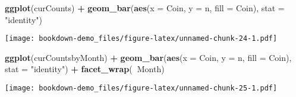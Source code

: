 \documentclass[
]{book}
\newenvironment{Shaded}{\begin{snugshade}}{\end{snugshade}}
\newcommand{\CommentTok}[1]{\textcolor[rgb]{0.56,0.35,0.01}{\textit{#1}}}
\newcommand{\DataTypeTok}[1]{\textcolor[rgb]{0.13,0.29,0.53}{#1}}
\newcommand{\KeywordTok}[1]{\textcolor[rgb]{0.13,0.29,0.53}{\textbf{#1}}}
\newcommand{\NormalTok}[1]{#1}
\newcommand{\OperatorTok}[1]{\textcolor[rgb]{0.81,0.36,0.00}{\textbf{#1}}}
\newcommand{\OtherTok}[1]{\textcolor[rgb]{0.56,0.35,0.01}{#1}}
\newcommand{\StringTok}[1]{\textcolor[rgb]{0.31,0.60,0.02}{#1}}
\begin{document}
\begin{Shaded}
\end{Shaded}

\begin{Shaded}
\begin{Highlighting}[]
\KeywordTok{ggplot}\NormalTok{(curCounts) }\OperatorTok{+}
\StringTok{  }\KeywordTok{geom_bar}\NormalTok{(}\KeywordTok{aes}\NormalTok{(}\DataTypeTok{x =}\NormalTok{ Coin, }\DataTypeTok{y =}\NormalTok{ n, }\DataTypeTok{fill =}\NormalTok{ Coin), }\DataTypeTok{stat =} \StringTok{"identity"}\NormalTok{)}
\end{Highlighting}
\end{Shaded}

\texttt{[image: bookdown-demo\_files/figure-latex/unnamed-chunk-24-1.pdf]}

\begin{Shaded}
\begin{Highlighting}[]
\KeywordTok{ggplot}\NormalTok{(curCountsbyMonth) }\OperatorTok{+}
\StringTok{  }\KeywordTok{geom_bar}\NormalTok{(}\KeywordTok{aes}\NormalTok{(}\DataTypeTok{x =}\NormalTok{ Coin, }\DataTypeTok{y =}\NormalTok{ n, }\DataTypeTok{fill =}\NormalTok{ Coin), }\DataTypeTok{stat =} \StringTok{"identity"}\NormalTok{) }\OperatorTok{+}
\StringTok{  }\KeywordTok{facet_wrap}\NormalTok{(}\OperatorTok{~}\NormalTok{Month)}
\end{Highlighting}
\end{Shaded}

\texttt{[image: bookdown-demo\_files/figure-latex/unnamed-chunk-25-1.pdf]}

  
\end{document}
